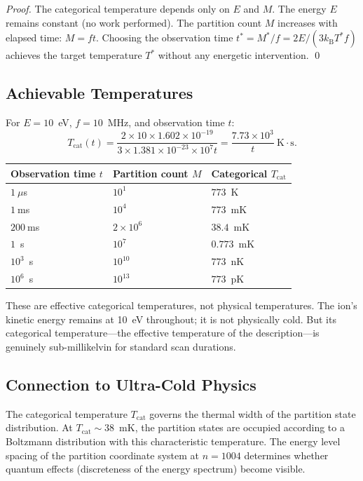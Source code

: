 \documentclass[twocolumn,10pt]{article}
\newcommand{\kB}{k_{\mathrm{B}}}
\newcommand{\Tcat}{T_{\mathrm{cat}}}
\begin{document}
\begin{proof}
The categorical temperature depends only on $E$ and $M$. The energy $E$ remains constant (no work performed). The partition count $M$ increases with elapsed time: $M = ft$. Choosing the observation time $t^* = M^*/f = 2E/(3\kB T^* f)$ achieves the target temperature $T^*$ without any energetic intervention. \qed
\end{proof}

\subsection{Achievable Temperatures}

For $E = 10$~eV, $f = 10$~MHz, and observation time $t$:
\begin{equation}
    \Tcat(t) = \frac{2 \times 10 \times 1.602 \times 10^{-19}}{3 \times 1.381 \times 10^{-23} \times 10^7 t} = \frac{7.73 \times 10^3}{t}~\text{K}\cdot\text{s}.
\end{equation}

\begin{center}
\begin{tabular}{lll}
\toprule
Observation time $t$ & Partition count $M$ & Categorical $\Tcat$ \\
\midrule
$1~\mu$s & $10^1$ & $773$~K \\
$1~$ms & $10^4$ & $773$~mK \\
$200~$ms & $2\times10^6$ & $38.4$~mK \\
$1$~s & $10^7$ & $0.773$~mK \\
$10^3$~s & $10^{10}$ & $773$~nK \\
$10^6$~s & $10^{13}$ & $773$~pK \\
\bottomrule
\end{tabular}
\end{center}

These are effective categorical temperatures, not physical temperatures. The ion's kinetic energy remains at 10~eV throughout; it is not physically cold. But its categorical temperature---the effective temperature of the description---is genuinely sub-millikelvin for standard scan durations.

\subsection{Connection to Ultra-Cold Physics}

The categorical temperature $\Tcat$ governs the thermal width of the partition state distribution. At $\Tcat \sim 38$~mK, the partition states are occupied according to a Boltzmann distribution with this characteristic temperature. The energy level spacing of the partition coordinate system at $n = 1004$ determines whether quantum effects (discreteness of the energy spectrum) become visible.
\end{document}
